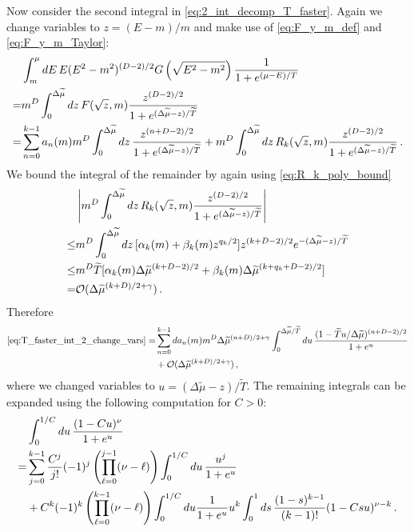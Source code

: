 \documentclass[sn-mathphys,Numbered]{sn-jnl}
\begin{document}
Now consider the second integral in \eqref{eq:2_int_decomp_T_faster}. Again we change variables to $z=(E-m)/m$ and make use of \eqref{eq:F_y_m_def} and \eqref{eq:F_y_m_Taylor}:
\begin{align}\label{eq:T_faster_int_2_change_vars} 
  &\int_m^{\mu} dE \,E(E^2-m^2)^{(D-2)/2} G\left(\sqrt{E^2-m^2}\right)\frac{1}{1+e^{(\mu-E)/T}} \\\notag
  =&m^{D}\int_0^{\Delta\widetilde{\mu}} dz \, F(\sqrt{z},m)\frac{z^{(D-2)/2}}{1+e^{(\Delta\widetilde{\mu}-z)/\widetilde{T}}}\notag\\
  =&\sum_{n=0}^{k-1} a_n(m)m^{D}\int_0^{\Delta\widetilde{\mu}} dz \,\frac{z^{(n+D-2)/2}}{1+e^{(\Delta\widetilde{\mu}-z)/\widetilde{T}}} +m^{D}\int_0^{\Delta\widetilde{\mu}} dz \,R_k(\sqrt{z},m)
\frac{z^{(D-2)/2}}{1+e^{(\Delta\widetilde{\mu}-z)/\widetilde{T}}}\notag\,.
\end{align}
We bound the integral of the remainder by again using \eqref{eq:R_k_poly_bound}
\begin{align}
 &\left|m^{D}\int_0^{\Delta\widetilde{\mu}} dz \,R_k(\sqrt{z},m)
\frac{z^{(D-2)/2}}{1+e^{(\Delta\widetilde{\mu}-z)/\widetilde{T}}}\right|\\
\leq&m^{D}\int_0^{\Delta\widetilde{\mu}} dz \,[\alpha_k(m)+\beta_k(m)z^{q_k/2}]z^{(k+D-2)/2}e^{-(\Delta\widetilde{\mu}-z)/\widetilde{T}}\notag\\
\leq &m^{D}\widetilde{T}[\alpha_k(m)\Delta\widetilde{\mu}^{(k+D-2)/2}+\beta_k(m)\Delta\widetilde{\mu}^{(k+q_k+D-2)/2}]\notag\\
=&\mathcal{O}(\Delta\widetilde{\mu}^{(k+D)/2+\gamma})\,.\notag
\end{align}
Therefore 
\begin{align}    \label{eq:T_faster_int_2_expanded1}
    \eqref{eq:T_faster_int_2_change_vars} =&\sum_{n=0}^{k-1} da_n(m)m^{D}\Delta\widetilde{\mu}^{(n+D)/2+\gamma}\int^{\Delta\widetilde{\mu}/\widetilde{T}}_{0} du \,\frac{(1-\widetilde{T}u/\Delta\widetilde{\mu})^{(n+D-2)/2}}{1+e^{u}} \\
    &+\mathcal{O}(\Delta\widetilde{\mu}^{(k+D)/2+\gamma})\notag\,,
\end{align}
where we changed variables to $u=(\Delta\widetilde{\mu}-z)/\widetilde{T}$. The remaining integrals can be expanded using the following computation for $C>0$: 
\begin{align}
&\int_0^{1/C} du \,\frac{(1-Cu)^\nu}{1+e^u}\\
=&\sum_{j=0}^{k-1}\frac{C^j}{j!}(-1)^j\left(\prod_{\ell=0}^{j-1}(\nu-\ell) \right)\int_0^{1/C} du \,\frac{u^j}{1+e^u}  \notag\\
&+ C^k (-1)^k\left(\prod_{\ell=0}^{k-1}(\nu-\ell)\right)\int_0^{1/C} du \frac{1}{1+e^u} u^k\int_0^1ds\,\frac{(1-s)^{k-1}}{(k-1)!} (1-Csu)^{\nu-k}\,.\notag
\end{align}
\end{document}
